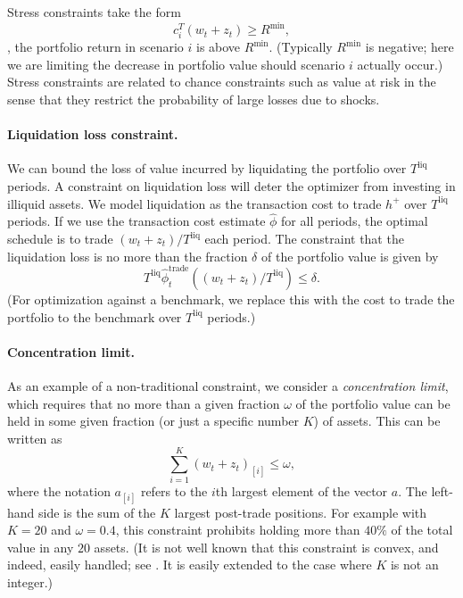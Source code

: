 \documentclass[openany]{now}
\newcommand{\cov}{\mathbf{cov}}
\newcommand{\trcosthat}{\hat \phi^\mathrm{trade}}
\renewcommand{\S}{section~}
\begin{document}
Stress constraints take the form
\[
c_i^T(w_t + z_t) \geq R^\mathrm{min},
\]
\ie, the portfolio return in scenario $i$ is above $R^\mathrm{min}$.
(Typically $R^\mathrm{min}$ is negative; here we are limiting the decrease in portfolio
value should scenario $i$ actually occur.)
Stress constraints are related to chance constraints such as value at risk in the sense that
they restrict the probability of large losses due to shocks.



\paragraph{Liquidation loss constraint.}
We can bound the loss of value incurred by liquidating
the portfolio over $T^\mathrm{liq}$ periods.
A constraint on liquidation loss will deter the optimizer from investing in
illiquid assets.
We model liquidation as the transaction cost to trade $h^+$ over
$T^\mathrm{liq}$ periods.
If we use the transaction cost estimate $\hat \phi$ for all periods,
the optimal schedule is to trade $(w_t + z_t)/T^\mathrm{liq}$ each period.
The constraint that the liquidation loss is no more than the fraction $\delta$
of the portfolio value is given by
\[
T^\mathrm{liq} \trcosthat_t((w_t + z_t)/T^\mathrm{liq}) \leq \delta.
\]
(For optimization against a benchmark, we replace this with the
cost to trade the portfolio to the benchmark
over $T^\mathrm{liq}$ periods.)

\paragraph{Concentration limit.}
As an example of a non-traditional constraint, we consider a
\emph{concentration limit}, which requires that no more than a given fraction $\omega$
of the portfolio value can be held in some given fraction
(or just a specific number $K$) of assets.  This can be written as
\[
\sum_{i=1}^K (w_t+z_t)_{[i]} \leq \omega,
\]
where the notation $a_{[i]}$ refers to the $i$th largest
element of the vector $a$.  The left-hand side is the sum of the $K$ largest
post-trade positions.
For example with $K=20$ and $\omega = 0.4$, this constraint prohibits holding
more than $40\%$ of the total value in any $20$ assets.
(It is not well known that this constraint is convex, and indeed,
easily handled; see \cite[\S 3.2.3]{boyd2004convex}.
It is easily extended to the case where $K$ is not an integer.)
\end{document}
